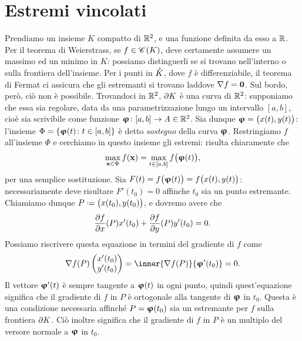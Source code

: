 \section{Estremi vincolati}
Prendiamo un insieme $K$ compatto di $\mathbb{R}^2$, e una funzione definita da esso a $\mathbb{R}$.
Per il teorema di Weierstrass, se $f\in\mathscr C^{}(K)$, deve certamente assumere un massimo ed un minimo in $K$: possiamo distinguerli se si trovano nell'interno o sulla frontiera dell'insieme.
Per i punti in $\mathring{K}$, dove $f$ è differenziabile, il teorema di Fermat ci assicura che gli estremanti si trovano laddove $\nabla f=\mathbf{0}$.
Sul bordo, però, ciò non è possibile. Trovandoci in $\mathbb{R}^2$, $\partial K$ è una curva di $\mathbb{R}^2$: supponiamo che essa sia regolare, data da una parametrizzazione lungo un intervallo $[a,b]$, cioè sia scrivibile come funzione $\bm{\upvarphi}\colon[a,b]\to A\in\mathbb{R}^2$.
Sia dunque $\bm{\upvarphi}=\big(x(t),y(t)\big)$: l'insieme $\Phi=\{\bm{\upvarphi}(t)\colon t\in[a,b]\}$ è detto \emph{sostegno} della curva $\bm{\upvarphi}$.
Restringiamo $f$ all'insieme $\Phi$ e cerchiamo in questo insieme gli estremi: risulta chiaramente che
\begin{equation*}
	\max_{\mathbf{x}\in\Phi}f(\mathbf{x})=\max_{t\in[a,b]}f\big(\bm{\upvarphi}(t)\big),
\end{equation*}
per una semplice sostituzione.
Sia $F(t)=f\big(\bm{\upvarphi}(t)\big)=f\big(x(t),y(t)\big)$: necessariamente deve risultare $F'(t_0)=0$ affinche $t_0$ sia un punto estremante.
Chiamiamo dunque $P\defeq\big(x(t_0),y(t_0)\big)$, e dovremo avere che
\begin{equation}
	\frac{\partial {f}}{\partial {x}}(P)x'(t_0)+\frac{\partial {f}}{\partial {y}}(P)y'(t_0)=0.
\end{equation}
Possiamo riscrivere questa equazione in termini del gradiente di $f$ come
\begin{equation}
	\grad f(P)\begin{pmatrix} x'(t_0)\\y'(t_0) \end{pmatrix}=\inner{\grad f(P)}{\vphi'(t_0)}=0.
\end{equation}
Il vettore $\bm{\upvarphi}'(t)$ è sempre tangente a $\bm{\upvarphi}(t)$ in ogni punto, quindi quest'equazione significa che il gradiente di $f$ in $P$ è ortogonale alla tangente di $\bm{\upvarphi}$ in $t_0$.
Questa è una condizione necessaria affinché $P=\bm{\upvarphi}(t_0)$ sia un estremante per $f$ sulla frontiera $\partial K$.
Ciò inoltre significa che il gradiente di $f$ in $P$ è un multiplo del versore normale a $\bm{\upvarphi}$ in $t_0$.

